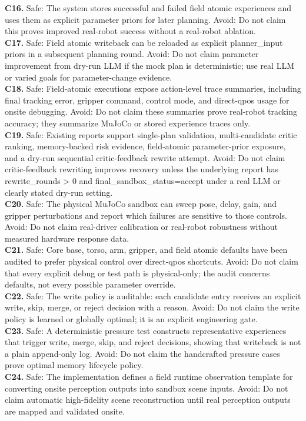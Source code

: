 \noindent\textbf{C16.} Safe: The system stores successful and failed field atomic experiences and uses them as explicit parameter priors for later planning. Avoid: Do not claim this proves improved real-robot success without a real-robot ablation.\\
\noindent\textbf{C17.} Safe: Field atomic writeback can be reloaded as explicit planner\_input priors in a subsequent planning round. Avoid: Do not claim parameter improvement from dry-run LLM if the mock plan is deterministic; use real LLM or varied goals for parameter-change evidence.\\
\noindent\textbf{C18.} Safe: Field-atomic executions expose action-level trace summaries, including final tracking error, gripper command, control mode, and direct-qpos usage for onsite debugging. Avoid: Do not claim these summaries prove real-robot tracking accuracy; they summarize MuJoCo or stored experience traces only.\\
\noindent\textbf{C19.} Safe: Existing reports support single-plan validation, multi-candidate critic ranking, memory-backed risk evidence, field-atomic parameter-prior exposure, and a dry-run sequential critic-feedback rewrite attempt. Avoid: Do not claim critic-feedback rewriting improves recovery unless the underlying report has rewrite\_rounds > 0 and final\_sandbox\_status=accept under a real LLM or clearly stated dry-run setting.\\
\noindent\textbf{C20.} Safe: The physical MuJoCo sandbox can sweep pose, delay, gain, and gripper perturbations and report which failures are sensitive to those controls. Avoid: Do not claim real-driver calibration or real-robot robustness without measured hardware response data.\\
\noindent\textbf{C21.} Safe: Core base, torso, arm, gripper, and field atomic defaults have been audited to prefer physical control over direct-qpos shortcuts. Avoid: Do not claim that every explicit debug or test path is physical-only; the audit concerns defaults, not every possible parameter override.\\
\noindent\textbf{C22.} Safe: The write policy is auditable: each candidate entry receives an explicit write, skip, merge, or reject decision with a reason. Avoid: Do not claim the write policy is learned or globally optimal; it is an explicit engineering gate.\\
\noindent\textbf{C23.} Safe: A deterministic pressure test constructs representative experiences that trigger write, merge, skip, and reject decisions, showing that writeback is not a plain append-only log. Avoid: Do not claim the handcrafted pressure cases prove optimal memory lifecycle policy.\\
\noindent\textbf{C24.} Safe: The implementation defines a field runtime observation template for converting onsite perception outputs into sandbox scene inputs. Avoid: Do not claim automatic high-fidelity scene reconstruction until real perception outputs are mapped and validated onsite.\\
